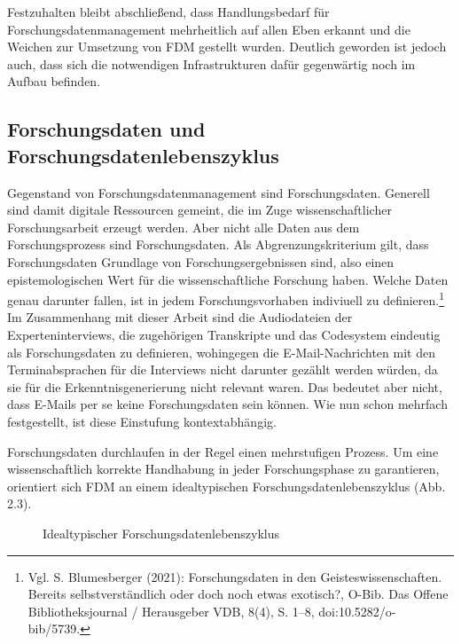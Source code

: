 Festzuhalten bleibt abschließend, dass Handlungsbedarf für Forschungsdatenmanagement mehrheitlich auf allen Eben erkannt und die Weichen zur Umsetzung von FDM gestellt wurden. Deutlich geworden ist jedoch auch, dass sich die notwendigen Infrastrukturen dafür gegenwärtig noch im Aufbau befinden.   

\subsection{Forschungsdaten und Forschungsdatenlebenszyklus}

Gegenstand von Forschungsdatenmanagement sind Forschungsdaten. Generell sind damit digitale Ressourcen gemeint, die im Zuge wissenschaftlicher Forschungsarbeit erzeugt werden. Aber nicht alle Daten aus dem Forschungsprozess sind Forschungsdaten. Als Abgrenzungskriterium gilt, dass Forschungsdaten Grundlage von Forschungsergebnissen sind, also einen epistemologischen Wert  für die wissenschaftliche Forschung haben. Welche Daten genau darunter fallen, ist in jedem Forschungsvorhaben indiviuell zu definieren.\footnote{Vgl. S. Blumesberger (2021): Forschungsdaten in den Geisteswissenschaften. Bereits selbstverständlich oder doch noch etwas exotisch?, O-Bib. Das Offene Bibliotheksjournal / Herausgeber VDB, 8(4), S. 1–8, doi:10.5282/o-bib/5739.} Im Zusammenhang mit dieser Arbeit sind die Audiodateien der Experteninterviews, die zugehörigen Transkripte und das Codesystem eindeutig als Forschungsdaten zu definieren, wohingegen die E-Mail-Nachrichten mit den Terminabsprachen für die Interviews nicht darunter gezählt werden würden, da sie für die Erkenntnisgenerierung nicht relevant waren. Das bedeutet aber nicht, dass E-Mails per se keine Forschungsdaten sein können. Wie nun schon mehrfach festgestellt, ist diese Einstufung kontextabhängig.

Forschungsdaten durchlaufen in der Regel einen mehrstufigen Prozess. Um eine wissenschaftlich korrekte Handhabung in jeder Forschungsphase zu garantieren, orientiert sich FDM an einem idealtypischen Forschungsdatenlebenszyklus (Abb. 2.3).

\begin{figure}[h]
    \centering
    \caption{Idealtypischer Forschungsdatenlebenszyklus\protect\footnotemark}
    \label{fig:x cubed graph}
\end{figure} 

